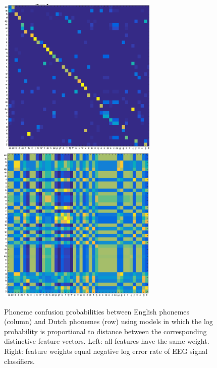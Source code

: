 \begin{figure}
  \centerline{
    \includegraphics[width=3in]{../figs/mirbagheri_dist_features.png}
    \includegraphics[width=3in]{../figs/mirbagheri_dist_eeg.png}
  }
  \caption{Phoneme confusion probabilities between English phonemes
    (column) and Dutch phonemes (row) using models in which the log
    probability is proportional to distance between the corresponding
    distinctive feature vectors.  Left: all features have the same
    weight.  Right: feature weights equal negative log error rate of
    EEG signal classifiers.}
  \label{fig:eeg_confusions}
\end{figure}
    
